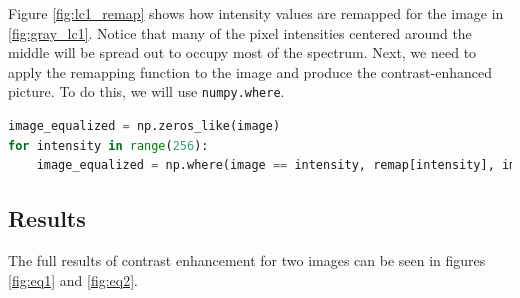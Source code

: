\documentclass[11pt,a4paper]{article}
\begin{document}
Figure \ref{fig:lc1_remap} shows how intensity values are remapped for the image in \ref{fig:gray_lc1}. Notice that many of the pixel intensities centered around the middle will be spread out to occupy most of the spectrum.
Next, we need to apply the remapping function to the image and produce the contrast-enhanced picture. To do this, we will use \verb|numpy.where|.

\begin{lstlisting}[language=Python]
image_equalized = np.zeros_like(image)
for intensity in range(256):
    image_equalized = np.where(image == intensity, remap[intensity], image_equalized)
\end{lstlisting}

\subsection{Results}
The full results of contrast enhancement for two images can be seen in figures \ref{fig:eq1} and \ref{fig:eq2}.
\end{document}
